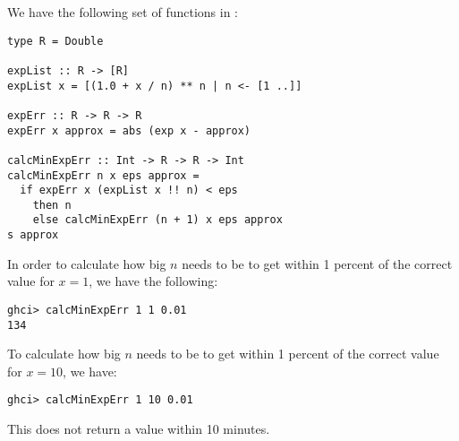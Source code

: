
We have the following set of functions in :
\scriptsize\begin{verbatim}
type R = Double

expList :: R -> [R]
expList x = [(1.0 + x / n) ** n | n <- [1 ..]]

expErr :: R -> R -> R
expErr x approx = abs (exp x - approx)

calcMinExpErr :: Int -> R -> R -> Int
calcMinExpErr n x eps approx =
  if expErr x (expList x !! n) < eps
    then n
    else calcMinExpErr (n + 1) x eps approx
s approx
\end{verbatim}\normalsize
In order to calculate how big $n$ needs to be to get within 1 percent of the correct 
value for $x = 1$, we have the following:
\scriptsize\begin{verbatim}
ghci> calcMinExpErr 1 1 0.01
134
\end{verbatim}\normalsize
To calculate how big $n$ needs to be to get within 1 percent of the correct value for
$x = 10$, we have:
\scriptsize\begin{verbatim}
ghci> calcMinExpErr 1 10 0.01
\end{verbatim}\normalsize
This does not return a value within 10 minutes.
